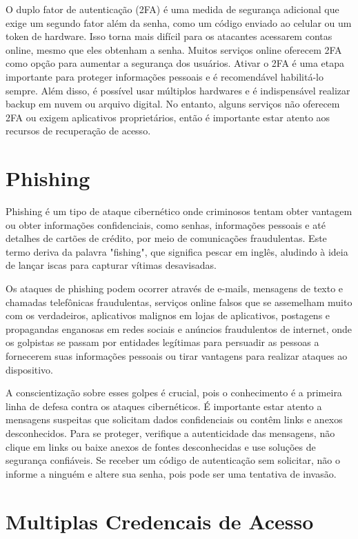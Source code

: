 \documentclass[12pt]{article}
\begin{document}
O duplo fator de autenticação (2FA) é uma medida de segurança adicional
que exige um segundo fator além da senha, como um código enviado ao
celular ou um token de hardware.
Isso torna mais difícil para os atacantes acessarem contas online, mesmo
que eles obtenham a senha.
Muitos serviços online oferecem 2FA como opção para aumentar a segurança
dos usuários.
Ativar o 2FA é uma etapa importante para proteger informações pessoais e
é recomendável habilitá-lo sempre.
Além disso, é possível usar múltiplos hardwares e é indispensável
realizar backup em nuvem ou arquivo digital. No entanto, alguns serviços
não oferecem 2FA ou exigem aplicativos proprietários, então é importante
estar atento aos recursos de recuperação de acesso.

\section{Phishing}

Phishing é um tipo de ataque cibernético onde criminosos tentam obter
vantagem ou obter informações confidenciais, como senhas, informações
pessoais e até detalhes de cartões de crédito, por meio de comunicações
fraudulentas.
Este termo deriva da palavra "fishing", que significa pescar em inglês,
aludindo à ideia de lançar iscas para capturar vítimas desavisadas.

Os ataques de phishing podem ocorrer através de e-mails, mensagens de
texto e chamadas telefônicas fraudulentas, serviços online falsos que
se assemelham muito com os verdadeiros, aplicativos malignos em lojas
de aplicativos, postagens e propagandas enganosas em redes sociais e
anúncios fraudulentos de internet, onde os golpistas se passam por
entidades legítimas para persuadir as pessoas a fornecerem suas informações
pessoais ou tirar vantagens para realizar ataques ao dispositivo.

A conscientização sobre esses golpes é crucial, pois o conhecimento é a
primeira linha de defesa contra os ataques cibernéticos.
É importante estar atento a mensagens suspeitas que solicitam dados
confidenciais ou contêm links e anexos desconhecidos. Para se proteger,
verifique a autenticidade das mensagens, não clique em links ou baixe
anexos de fontes desconhecidas e use soluções de segurança confiáveis.
Se receber um código de autenticação sem solicitar, não o informe a
ninguém e altere sua senha, pois pode ser uma tentativa de invasão.

\section{Multiplas Credencais de Acesso}
\end{document}
